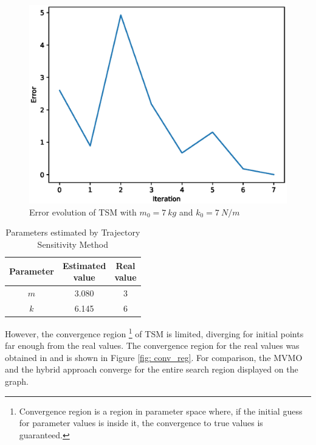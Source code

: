 \begin{figure}[h]
	\caption{Error evolution of TSM with $m_{0} = 7\ kg$ and $k_{0} = 7\ N/m$}
	\begin{center}
		\includegraphics[scale=0.6]{Images/spring_mass_ts_conv.eps}
	\end{center}
	\label{fig: TS_conv}
\end{figure}

\begin{table}[h]
	\caption{Parameters estimated by Trajectory Sensitivity Method}
	\begin{center}
		\begin{tabular}{c|c|c}
			Parameter & \shortstack{Estimated \\ value} & \shortstack{Real \\ value} \\
			\hline
			$m$ & 3.080 & 3 \\
			$k$ & 6.145 & 6 \\
		\end{tabular}
	\end{center}
	\label{tab: spring_mass_ts}
\end{table}

However, the convergence region \footnote{Convergence region is a region in parameter space where, if the initial guess for parameter values is inside it, the convergence to true values is guaranteed.} of TSM is limited, diverging for initial points far enough from the real values. The convergence region for the real values was obtained in \cite{Ecyo} and is shown in Figure \ref{fig: conv_reg}. For comparison, the MVMO and the hybrid approach converge for the entire search region displayed on the graph.

